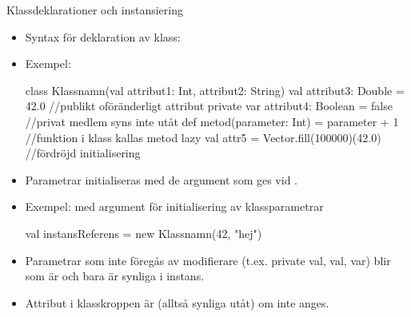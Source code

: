 \begin{Slide}{Klassdeklarationer och instansiering}\SlideFontSmall
\setlength{\leftmargini}{0pt}
\begin{itemize}
\item Syntax för deklaration av klass: \\ \vspace{0.5em}
\item Exempel: 
\begin{Code}
class Klassnamn(val attribut1: Int, attribut2: String){
  val attribut3: Double = 42.0              //publikt oföränderligt attribut
  private var attribut4: Boolean = false    //privat medlem syns inte utåt
  def metod(parameter: Int) = parameter + 1 //funktion i klass kallas metod
  lazy val attr5 = Vector.fill(100000)(42.0)     //fördröjd initialisering
}
\end{Code}

\item Parametrar initialiseras med de argument som ges vid .
\item Exempel:  med argument för initialisering av klassparametrar
\begin{Code}
val instansReferens = new Klassnamn(42, "hej")
\end{Code}

\item Parametrar som inte föregås av modifierare (t.ex. private val, val, var) blir  som är  och bara är synliga i  instans.
\item Attribut i klasskroppen är  (alltså synliga utåt) om inte  anges.
\end{itemize}
\end{Slide}




